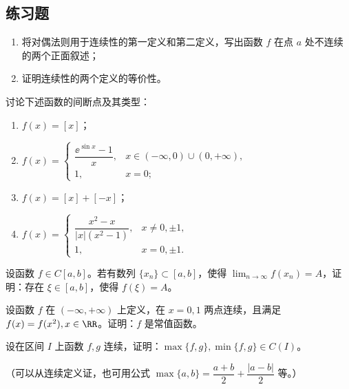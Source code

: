 \subsection{练习题}

\begin{xexercise}[1]
\begin{enumerate}[label=(\arabic*)]
    \item 将对偶法则用于连续性的第一定义和第二定义，写出函数 $f$ 在点 $a$ 处不连续的两个正面叙述；
    \item 证明连续性的两个定义的等价性。
  \end{enumerate}
\end{xexercise}

\begin{xexercise}[2]
讨论下述函数的间断点及其类型：
  \begin{enumerate}[label=(\arabic*)]
    \item $f(x)=[x]$；
    \item $f(x)=\begin{cases}\dfrac{\ee^{\sin x}-1}{x},&x\in(-\infty,0)\cup(0,+\infty),\\1,&x=0;\end{cases}$
    \item $f(x)=[x]+[-x]$；
    \item $f(x)=\begin{cases}\dfrac{x^2-x}{|x|(x^2-1)},&x\ne0,\pm1,\\1,&x=0,\pm1.\end{cases}$
  \end{enumerate}
\end{xexercise}

\begin{xexercise}[3]
设函数 $f\in C[a,b]$。若有数列 $\{x_n\}\subset[a,b]$，使得 $\lim_{n\to\infty}f(x_n)=A$，证明：存在 $\xi\in[a,b]$，使得 $f(\xi)=A$。
\end{xexercise}

\begin{xexercise}[4]
设函数 $f$ 在 $(-\infty,+\infty)$ 上定义，在 $x=0,1$ 两点连续，且满足 $f(x)=f(x^2),x\in\RR$。证明：$f$ 是常值函数。
\end{xexercise}

\begin{xexercise}[5]
设在区间 $I$ 上函数 $f,g$ 连续，证明：$\max\{f,g\},\min\{f,g\}\in C(I)$。

  （可以从连续定义证，也可用公式 $\max\{a,b\}=\dfrac{a+b}{2}+\dfrac{|a-b|}{2}$ 等。）
\end{xexercise}

